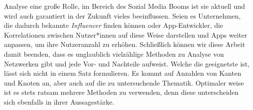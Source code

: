 Analyse eine große Rolle, im Bereich des Sozial Media Booms ist sie aktuell und wird auch garantiert in der Zukunft vieles beeinflussen. Seien es Unternehmen, die dadurch bekannte \textit{Influencer} finden können oder App-Entwickler, die Korrelationen zwischen Nutzer*innen auf diese Weise darstellen und Apps weiter anpassen, um ihre Nutzeranzahl zu erhöhen. Schließlich können wir diese Arbeit damit beenden, dass es unglaublich vielzählige Methoden zu Analyse von Netzwerken gibt und jede Vor- und Nachteile aufweist. Welche die geeignetste ist, lässt sich nicht in einem Satz formulieren. Es kommt auf Anzahlen von Kanten und Knoten an, aber auch auf die zu untersuchende Thematik. Optimaler weise ist es stets ratsam mehrere Methoden zu verwenden, denn diese unterscheiden sich ebenfalls in ihrer Aussagestärke.